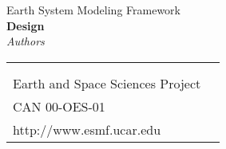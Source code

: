 \documentclass[]{article}
\begin{document}

\begin{titlepage}

\begin{center}
{\Large Earth System Modeling Framework } \\
\vspace{.25in}
{\Large {\bf <Module, Library, Component or Model Name> Design}} \\
\vspace{.25in}
{\large {\it Authors}}
\vspace{.5in}
\end{center}

\begin{latexonly}
\vspace{5.5in}
\begin{tabular}{p{5in}p{.9in}}
\hrulefill \\
\noindent {\bf NASA High Performance Computing and Communications Program} \\
\noindent Earth and Space Sciences Project \\
\noindent CAN 00-OES-01 \\
\noindent http://www.esmf.ucar.edu \\
\end{tabular}
\end{latexonly}

\end{titlepage}

\tableofcontents

\newpage


%

%


\end{document}
